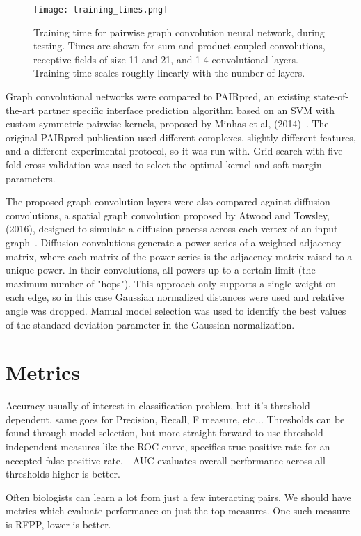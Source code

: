 \begin{figure}
	\texttt{[image: training\_times.png]}
	\caption{Training time for pairwise graph convolution neural network, during testing. Times are shown for sum and product coupled convolutions, receptive fields of size 11 and 21, and 1-4 convolutional layers. Training time scales roughly linearly with the number of layers.
	\label{fig:train_times}}
\end{figure}

Graph convolutional networks were compared to PAIRpred, an existing state-of-the-art partner specific interface prediction algorithm based on an SVM with custom symmetric pairwise kernels, proposed by Minhas et al, (2014)~\cite{minhas2014}.
The original PAIRpred publication used different complexes, slightly different features, and a different experimental protocol, so it was run with.
Grid search with five-fold cross validation was used to select the optimal kernel and soft margin parameters.

The proposed graph convolution layers were also compared against diffusion convolutions, a spatial graph convolution proposed by Atwood and Towsley, (2016), designed to simulate a diffusion process across each vertex of an input graph~\cite{atwood2016}.
Diffusion convolutions generate a power series of a weighted adjacency matrix, where each matrix of the power series is the adjacency matrix raised to a unique power.
In their convolutions, all powers up to a certain limit (the maximum number of "hops").
This approach only supports a single weight on each edge, so in this case Gaussian normalized distances were used and relative angle was dropped. 
Manual model selection was used to identify the best values of the standard deviation parameter in the Gaussian normalization.

\section{Metrics}

Accuracy usually of interest in classification problem, but it's threshold dependent.
same goes for Precision, Recall, F measure, etc...
Thresholds can be found through model selection, but more straight forward to use threshold independent measures like the ROC curve, specifies true positive rate for an accepted false positive rate.
- AUC evaluates overall performance across all thresholds higher is better. 

Often biologists can learn a lot from just a few interacting pairs. 
We should have metrics which evaluate performance on just the top measures. 
One such measure is RFPP, lower is better.

